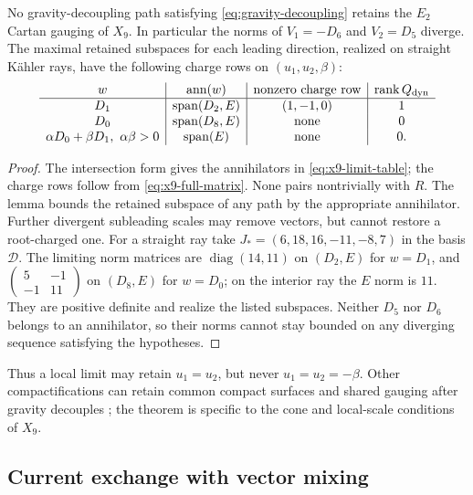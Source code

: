 \begin{theorem}\label{thm:no-rigid-limit}
No gravity-decoupling path satisfying \eqref{eq:gravity-decoupling}
retains the $E_2$ Cartan gauging of $X_9$. In particular the norms
of $V_1=-D_6$ and $V_2=D_5$ diverge. The maximal retained subspaces
for each leading direction, realized on straight K\"ahler rays,
have the following charge rows on $(u_1,u_2,\beta)$:
\begin{equation}
\begin{array}{c|c|c|c}
 w&\operatorname{ann}(w)&\hbox{nonzero charge row}&\rank Q_{\rm dyn}\\\hline
 D_1&\operatorname{span}(D_2,E)&(1,-1,0)&1\\
 D_0&\operatorname{span}(D_8,E)&\hbox{none}&0\\
 \alpha D_0+\beta D_1,\ \alpha\beta>0&\operatorname{span}(E)&\hbox{none}&0 .
\end{array}
\label{eq:x9-limit-table}
\end{equation}
\end{theorem}
\begin{proof}
The intersection form gives the annihilators in
\eqref{eq:x9-limit-table}; the charge rows follow from
\eqref{eq:x9-full-matrix}. None pairs nontrivially with $R$.
The lemma bounds the retained subspace of any path by the appropriate
annihilator. Further divergent subleading scales may remove vectors,
but cannot restore a root-charged one.
For a straight ray take $J_*=(6,18,16,-11,-8,7)$ in the basis
$\mathcal D$. The limiting norm matrices are
$\operatorname{diag}(14,11)$ on $(D_2,E)$ for $w=D_1$, and
$\left(\begin{smallmatrix}5&-1\\-1&11\end{smallmatrix}\right)$
on $(D_8,E)$ for $w=D_0$; on the interior ray the $E$ norm is
$11$. They are positive definite and realize the listed subspaces.
Neither $D_5$ nor $D_6$ belongs to an annihilator, so their norms
cannot stay bounded on any diverging sequence satisfying the hypotheses.
\end{proof}

Thus a local limit may retain $u_1=u_2$, but never
$u_1=u_2=-\beta$. Other compactifications can retain common
compact surfaces and shared gauging after gravity decouples
\cite{Apruzzi:2019vpe,Cvetic:2023plv}; the theorem is specific to
the cone and local-scale conditions of $X_9$.

\subsection{Current exchange with vector mixing}
\label{subsec:x9-current-exchange}

